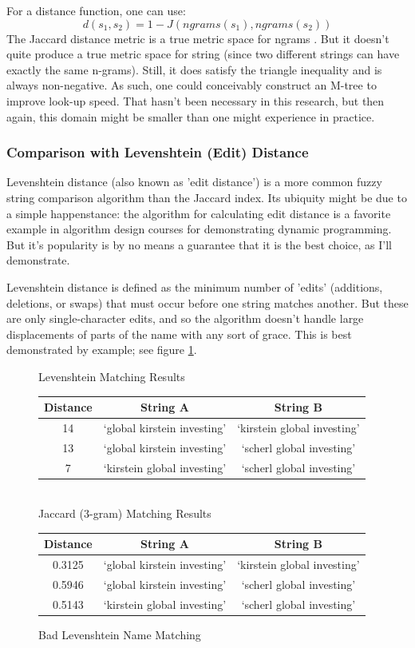 \documentclass[11pt]{article}
\begin{document}
For a distance function, one can use:
\[d(s_1,s_2) = 1-J(ngrams(s_1),ngrams(s_2))\]
The Jaccard distance metric is a true metric space for ngrams \cite{data_mining}.
But it doesn't quite produce a true metric space for string
(since two different strings can have exactly the same n-grams). Still, it does satisfy
the triangle inequality \cite{general} and is always non-negative. As such, one could
conceivably construct an M-tree \cite{mtree} to improve look-up speed. 
That hasn't been necessary in this research, but then again, this domain might be smaller
than one might experience in practice.

\subsubsection{Comparison with Levenshtein (Edit) Distance}
Levenshtein distance (also known as 'edit distance') is a more common fuzzy string comparison algorithm
than the Jaccard index. 
Its ubiquity might be due to a simple happenstance: the algorithm for calculating edit distance is
a favorite example in algorithm design courses for demonstrating dynamic programming.
But it's popularity is by no means a guarantee that it is the best choice, as I'll demonstrate.

Levenshtein distance is defined as \cite{levenshtein} the minimum number of 'edits' 
(additions, deletions, or swaps) that must occur before one string matches another.
But these are only single-character edits, and so the algorithm doesn't handle large displacements
of parts of the name with any sort of grace.
This is best demonstrated by example; see figure \ref{fig:lev_comp}.

\begin{figure}[h!]
\centering
Levenshtein Matching Results\\
\begin{tabular}{c|c|c}
  Distance & String A & String B \\
\hline
  14 & `global kirstein investing' & `kirstein global investing' \\
  13 & `global kirstein investing' & `scherl global investing' \\
  7 & `kirstein global investing' & `scherl global investing'
\end{tabular}
\\
Jaccard (3-gram) Matching Results\\
\begin{tabular}{c|c|c}
  Distance & String A & String B \\
\hline
  0.3125 & `global kirstein investing' & `kirstein global investing' \\
  0.5946 & `global kirstein investing' & `scherl global investing' \\
  0.5143 & `kirstein global investing' & `scherl global investing'
\end{tabular}
\caption{Bad Levenshtein Name Matching}
\label{fig:lev_comp}
\end{figure}
\end{document}
